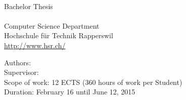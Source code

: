 \begin{titlepage}
\begin{flushleft}
{\huge \bfseries \TITLE}\\[2.5cm]

Bachelor Thesis \\
\SEMESTER \\
Computer Science Department \\
Hochschule für Technik Rapperswil \\
\url{http://www.hsr.ch/}\\[2cm]


\vfill

Authors: \AUTHOR \\
Supervisor: \SUPERVISOR \\
Scope of work: 12 ECTS (360 hours of work per Student) \\
Duration: February 16 until June 12, 2015 \\

\end{flushleft}
\end{titlepage}
